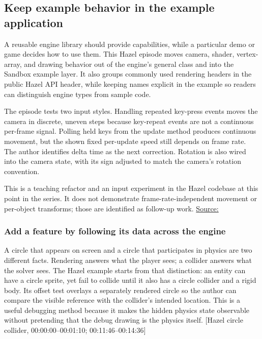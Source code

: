 \subsection{Keep example behavior in the example application}\label{05-engine-i-ch013-keep-example-behavior-in-the-example-application}

\hypertarget{05-engine-i-ch013-keep-example-behavior-in-the-example-application}{}

A reusable engine library should provide capabilities, while a particular demo or game decides how to use them. This Hazel episode moves camera, shader, vertex-array, and drawing behavior out of the engine's general  class and into the Sandbox example layer. It also groups commonly used rendering headers in the public Hazel API header, while keeping names explicit in the example so readers can distinguish engine types from sample code.

The episode tests two input styles. Handling repeated key-press events moves the camera in discrete, uneven steps because key-repeat events are not a continuous per-frame signal. Polling held keys from the update method produces continuous movement, but the shown fixed per-update speed still depends on frame rate. The author identifies delta time as the next correction. Rotation is also wired into the camera state, with its sign adjusted to match the camera's rotation convention.

This is a teaching refactor and an input experiment in the Hazel codebase at this point in the series. It does not demonstrate frame-rate-independent movement or per-object transforms; those are identified as follow-up work. \href{https://www.youtube.com/watch?v=4zj-0FQ7Xbg}{Source:}

\subsubsection{Add a feature by following its data across the engine}\label{05-engine-i-ch013-add-a-feature-by-following-its-data-across-the-engine}

\hypertarget{05-engine-i-ch013-add-a-feature-by-following-its-data-across-the-engine}{}

A circle that appears on screen and a circle that participates in physics are two different facts. Rendering answers what the player sees; a collider answers what the solver sees. The Hazel example starts from that distinction: an entity can have a circle sprite, yet fail to collide until it also has a circle collider and a rigid body. Its offset test overlays a separately rendered circle so the author can compare the visible reference with the collider's intended location. This is a useful debugging method because it makes the hidden physics state observable without pretending that the debug drawing is the physics itself. {[}Hazel circle collider, 00:00:00--00:01:10; 00:11:46--00:14:36{]}


